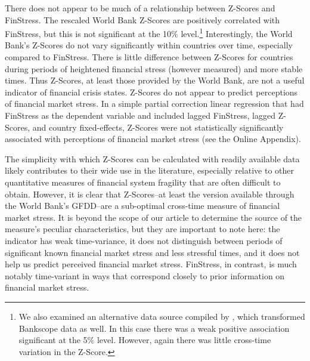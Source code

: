 \documentclass[]{article}
\begin{document}
There does not appear to be much of a relationship between Z-Scores and FinStress. The rescaled World Bank Z-Scores are positively correlated with FinStress, but this is not significant at the 10\% level.\footnote{We also examined an alternative data source compiled by \cite{Andrianova2015}, which transformed Bankscope data as well. In this case there was a weak positive association significant at the 5\% level. However, again there was little cross-time variation in the Z-Score.} Interestingly, the World Bank's Z-Scores do not vary significantly within countries over time, especially compared to  FinStress. There is little difference between Z-Scores for countries during periods of heightened financial stress (however measured) and more stable times. Thus Z-Scores, at least those provided by the World Bank, are not a useful indicator of financial crisis states. Z-Scores do not appear to predict perceptions of financial market stress. In a simple partial correction linear regression that had FinStress as the dependent variable and included lagged FinStress, lagged Z-Scores, and country fixed-effects, Z-Scores were not statistically significantly associated with perceptions of financial market stress (see the Online Appendix).

The simplicity with which Z-Scores can be calculated with readily available data likely contributes to their wide use in the literature, especially relative to other quantitative measures of financial system fragility that are often difficult to obtain. However, it is clear that Z-Scores--at least the version available through the World Bank's GFDD--are a sub-optimal cross-time measure of financial market stress. It is beyond the scope of our article to determine the source of the measure's peculiar characteristics, but they are important to note here: the indicator has weak time-variance, it does not distinguish between periods of significant known financial market stress and less stressful times, and it does not help us predict perceived financial market stress. FinStress, in contrast, is much notably time-variant in ways that correspond closely to prior information on financial market stress.
\end{document}
